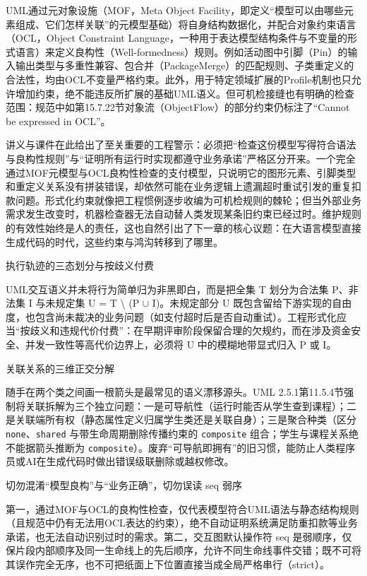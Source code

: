 \documentclass[UTF8,a4paper,11pt,fontset=fandol]{ctexart}
\begin{document}
UML通过元对象设施（MOF，Meta Object Facility，即定义“模型可以由哪些元素组成、它们怎样关联”的元模型基础）将自身结构数据化，并配合对象约束语言（OCL，Object Constraint Language，一种用于表达模型结构条件与不变量的形式语言）来定义良构性（Well-formedness）规则。例如活动图中引脚（Pin）的输入输出类型与多重性兼容、包合并（PackageMerge）的匹配规则、子类重定义的合法性，均由OCL不变量严格约束。此外，用于特定领域扩展的Profile机制也只允许增加约束，绝不能违反所扩展的基础UML语义。但可机检接缝也有明确的检查范围：规范中如第15.7.22节对象流（ObjectFlow）的部分约束仍标注了“Cannot be expressed in OCL”。

讲义与课件在此给出了至关重要的工程警示：必须把“检查这份模型写得符合语法与良构性规则”与“证明所有运行时实现都遵守业务承诺”严格区分开来。一个完全通过MOF元模型与OCL良构性检查的支付模型，只说明它的图形元素、引脚类型和重定义关系没有拼装错误，却依然可能在业务逻辑上遗漏超时重试引发的重复扣款问题。形式化约束就像把工程惯例逐步收编为可机检规则的棘轮；但当外部业务需求发生改变时，机器检查器无法自动替人类发现某条旧约束已经过时。维护规则的有效性始终是人的责任，这也自然引出了下一章的核心议题：在大语言模型直接生成代码的时代，这些约束与鸿沟转移到了哪里。

\begin{importantbox}{执行轨迹的三态划分与按歧义付费}

UML交互语义并未将行为简单归为非黑即白，而是把全集 T 划分为合法集 P、非法集 I 与未规定集 U = T \textbackslash{} (P \ensuremath{\cup} I)。未规定部分 U 既包含留给下游实现的自由度，也包含尚未裁决的业务问题（如支付超时后是否自动重试）。工程形式化应当“按歧义和违规代价付费”：在早期评审阶段保留合理的欠规约，而在涉及资金安全、并发一致性等高代价边界上，必须将 U 中的模糊地带显式归入 P 或 I。

\end{importantbox}

\begin{knowledgebox}{关联关系的三维正交分解}

随手在两个类之间画一根箭头是最常见的语义漂移源头。UML 2.5.1第11.5.4节强制将关联拆解为三个独立问题：一是可导航性（运行时能否从学生查到课程）；二是关联端所有权（静态属性定义归属学生类还是关联自身）；三是聚合种类（区分 \texttt{none}、\texttt{shared} 与带生命周期删除传播约束的 \texttt{composite} 组合；学生与课程关系绝不能据箭头推断为 \texttt{composite}）。废弃“可导航即拥有”的旧习惯，能防止人类程序员或AI在生成代码时做出错误级联删除或越权修改。

\end{knowledgebox}

\begin{warningbox}{切勿混淆“模型良构”与“业务正确”，切勿误读 seq 弱序}

第一，通过MOF与OCL的良构性检查，仅代表模型符合UML语法与静态结构规则（且规范中仍有无法用OCL表达的约束），绝不自动证明系统满足防重扣款等业务承诺，也无法自动识别过时的需求。第二，交互图默认操作符 seq 是弱顺序，仅保片段内部顺序及同一生命线上的先后顺序，允许不同生命线事件交错；既不可将其误作完全无序，也不可把纸面上下位置直接当成全局严格串行（strict）。

\end{warningbox}
\end{document}
